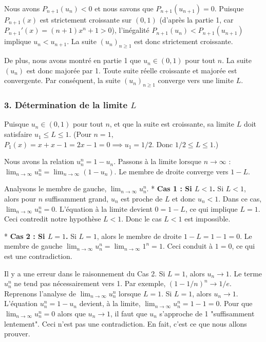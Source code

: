 \documentclass[a4paper,11pt]{report}
\begin{document}
Nous avons $P_{n+1}(u_n) < 0$ et nous savons que $P_{n+1}(u_{n+1}) = 0$.
Puisque $P_{n+1}(x)$ est strictement croissante sur $(0,1)$ (d'après la partie 1, car $P_{n+1}'(x) = (n+1)x^n + 1 > 0$), l'inégalité $P_{n+1}(u_n) < P_{n+1}(u_{n+1})$ implique $u_n < u_{n+1}$.
La suite $(u_n)_{n \ge 1}$ est donc strictement croissante.

De plus, nous avons montré en partie 1 que $u_n \in (0,1)$ pour tout $n$. La suite $(u_n)$ est donc majorée par 1.
Toute suite réelle croissante et majorée est convergente.
Par conséquent, la suite $(u_n)_{n \ge 1}$ converge vers une limite $L$.

\subsubsection*{3. Détermination de la limite $L$}

Puisque $u_n \in (0,1)$ pour tout $n$, et que la suite est croissante, sa limite $L$ doit satisfaire $u_1 \le L \le 1$.
(Pour $n=1$, $P_1(x) = x+x-1 = 2x-1=0 \implies u_1 = 1/2$. Donc $1/2 \le L \le 1$.)

Nous avons la relation $u_n^n = 1 - u_n$.
Passons à la limite lorsque $n \to \infty$ :
$\lim_{n \to \infty} u_n^n = \lim_{n \to \infty} (1 - u_n)$.
Le membre de droite converge vers $1 - L$.

Analysons le membre de gauche, $\lim_{n \to \infty} u_n^n$.
*   \textbf{Cas 1 : Si $L < 1$.}
    Si $L < 1$, alors pour $n$ suffisamment grand, $u_n$ est proche de $L$ et donc $u_n < 1$.
    Dans ce cas, $\lim_{n \to \infty} u_n^n = 0$.
    L'équation à la limite devient $0 = 1 - L$, ce qui implique $L = 1$.
    Ceci contredit notre hypothèse $L < 1$. Donc le cas $L < 1$ est impossible.

*   \textbf{Cas 2 : Si $L = 1$.}
    Si $L = 1$, alors le membre de droite $1 - L = 1 - 1 = 0$.
    Le membre de gauche $\lim_{n \to \infty} u_n^n = \lim_{n \to \infty} 1^n = 1$.
    Ceci conduit à $1 = 0$, ce qui est une contradiction.

Il y a une erreur dans le raisonnement du Cas 2. Si $L=1$, alors $u_n \to 1$.
Le terme $u_n^n$ ne tend pas nécessairement vers 1. Par exemple, $(1-1/n)^n \to 1/e$.
Reprenons l'analyse de $\lim_{n \to \infty} u_n^n$ lorsque $L=1$.
Si $L=1$, alors $u_n \to 1$.
L'équation $u_n^n = 1-u_n$ devient, à la limite, $\lim_{n \to \infty} u_n^n = 1 - 1 = 0$.
Pour que $\lim_{n \to \infty} u_n^n = 0$ alors que $u_n \to 1$, il faut que $u_n$ s'approche de 1 "suffisamment lentement".
Ceci n'est pas une contradiction. En fait, c'est ce que nous allons prouver.
\end{document}
